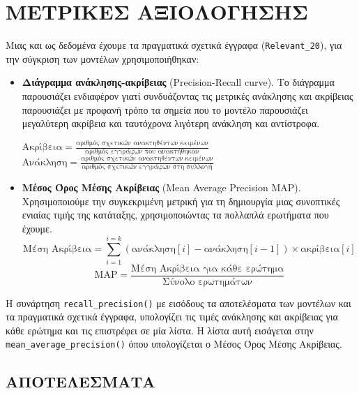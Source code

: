 ﻿\documentclass[12pt]{report}
\begin{document}
    \chapter{ΜΕΤΡΙΚΕΣ ΑΞΙΟΛΟΓΗΣΗΣ}
    Μιας και ως δεδομένα έχουμε τα πραγματικά σχετικά έγγραφα (\verb|Relevant_20|), για την σύγκριση των μοντέλων χρησιμοποιήθηκαν:
    \begin{itemize}
        \item \textbf{Διάγραμμα ανάκλησης-ακρίβειας} {\fontTimes(Precision-Recall curve)}. Το διάγραμμα παρουσιάζει ενδιαφέρον γιατί \textendash συνδυάζοντας τις μετρικές ανάκλησης και ακρίβειας\textendash \hspace{1pt}
        παρουσιάζει με προφανή τρόπο τα σημεία που το μοντέλο παρουσιάζει μεγαλύτερη ακρίβεια και ταυτόχρονα λιγότερη ανάκληση και αντίστροφα.

        \begin{multicols}{2}
            \centering
            \( \text{Ακρίβεια} = \frac{\text{αριθμός σχετικών ανακτηθέντων κειμένων}}{\text{αριθμός εγγράφων που ανακτήθηκαν}} \) \\
            \( \text{Ανάκληση} = \frac{\text{αριθμός σχετικών ανακτηθέντων κειμένων}}{\text{αριθμός σχετικών εγγράφων στη συλλογή}} \)
        \end{multicols}

        \item \textbf{Μέσος Όρος Μέσης Ακρίβειας} {\fontTimes (Mean Average Precision \textendash\hspace{1pt} MAP)}. Χρησιμοποιούμε την συγκεκριμένη μετρική
        για τη δημιουργία μιας συνοπτικές ενιαίας τιμής της κατάταξης, χρησιμοποιώντας τα πολλαπλά ερωτήματα που έχουμε.
        \vspace{-10pt}
        \[ \text{Μέση Ακρίβεια} = \sum_{i=1}^{i=k}(\text{ανάκληση}[i] - \text{ανάκληση}[i-1])\times\text{ακρίβεια}[i] \]
        \vspace{-5pt}
        \[ \text{MAP} = \frac{\text{Μέση Ακρίβεια για κάθε ερώτημα}}{\text{Σύνολο ερωτημάτων}} \]
    \end{itemize}

    Η συνάρτηση \verb|recall_precision()| με εισόδους τα αποτελέσματα των μοντέλων και τα πραγματικά σχετικά έγγραφα,
    υπολογίζει τις τιμές ανάκλησης και ακρίβειας για κάθε ερώτημα και τις επιστρέφει σε μία λίστα. Η λίστα αυτή εισάγεται στην \verb|mean_average_precision()|
    όπου υπολογίζεται ο Μέσος Όρος Μέσης Ακρίβειας.


    \section{\hspace{1pt}ΑΠΟΤΕΛΕΣΜΑΤΑ\hspace{1pt}}
\end{document}
